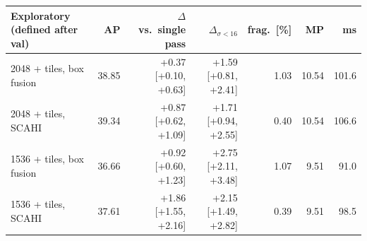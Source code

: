 \begin{tabular}{lrrrrrr}
\toprule
Exploratory (defined after val) & AP & $\Delta$ vs.\ single pass & $\Delta_{\sigma<16}$ & frag.\ [\%] & MP & ms \\
\midrule
2048 + tiles, box fusion & 38.85 & +0.37 {\scriptsize[+0.10, +0.63]} & +1.59 {\scriptsize[+0.81, +2.41]} & 1.03 & 10.54 & 101.6 \\
2048 + tiles, SCAHI & 39.34 & +0.87 {\scriptsize[+0.62, +1.09]} & +1.71 {\scriptsize[+0.94, +2.55]} & 0.40 & 10.54 & 106.6 \\
1536 + tiles, box fusion & 36.66 & +0.92 {\scriptsize[+0.60, +1.23]} & +2.75 {\scriptsize[+2.11, +3.48]} & 1.07 & 9.51 & 91.0 \\
1536 + tiles, SCAHI & 37.61 & +1.86 {\scriptsize[+1.55, +2.16]} & +2.15 {\scriptsize[+1.49, +2.82]} & 0.39 & 9.51 & 98.5 \\
\bottomrule
\end{tabular}
